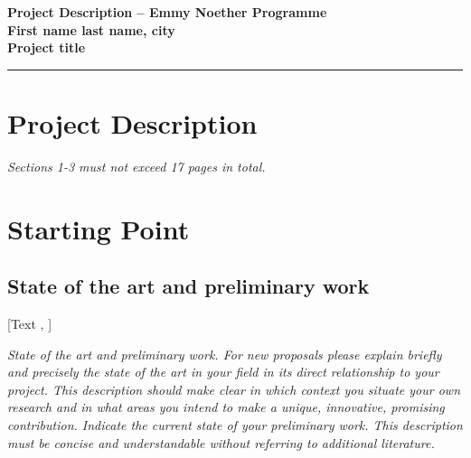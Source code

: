 \documentclass[11pt]{article} %
\begin{document}
\date{$\;$}
 

\noindent \textbf{Project Description – Emmy Noether Programme}
$\;$\\
$\;$\\
\noindent \textbf{First name  last name, city} \\
$\;$ \\
\noindent \textbf{Project title} \\
\noindent\rule{\textwidth}{1pt}



  


\section*{Project Description}
\textit{Sections 1-3 must not exceed 17 pages in total.}


\section{Starting Point}
\subsection{State of the art and preliminary work}
[Text \cite{Applicant2018Advances}, \cite{wilkinson2016fair}] 

\textit{State of the art and preliminary work. For new proposals please explain briefly and precisely the state of the art in your field in its direct relationship to your project. This description should make clear in which context you situate your own research and in what areas you intend to make a unique, innovative, promising contribution. Indicate the current state of your preliminary work. This description must be concise and understandable without referring to additional literature.}
\end{document}
